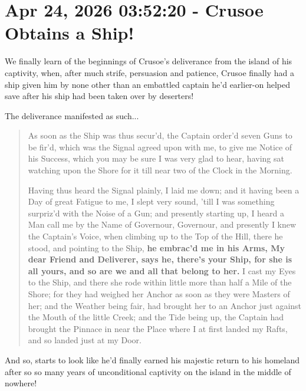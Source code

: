 \documentclass[a4paper]{article}
\begin{document}
\section{Apr 24, 2026 03:52:20 - Crusoe Obtains a Ship!}
\label{SEC64}


We finally learn of the beginnings of Crusoe's deliverance from the island of his captivity, when, after much strife, persuasion and patience, Crusoe finally had a ship given him by none other than an embattled captain he'd earlier-on helped save after his ship had been taken over by deserters!

The deliverance manifested as such...


\noindent
\begin{minipage}{1\textwidth}
\vspace{1em}
\begin{quotation}
{\ttfamily


As soon as the Ship was thus secur’d, the Captain order’d seven Guns to be fir’d, which was the Signal agreed upon with me, to give me Notice of his Success, which you may be sure I was very glad to hear, having sat watching upon the Shore for it till near two of the Clock in the Morning.

Having thus heard the Signal plainly, I laid me down; and it having been a Day of great Fatigue to me, I slept very sound, ’till I was something surpriz’d with the Noise of a Gun; and presently starting up, I heard a Man call me by the Name of Governour, Governour, and presently I knew the Captain’s Voice, when climbing up to the Top of the Hill, there he stood, and pointing to the Ship, \textbf{he embrac’d me in his Arms, My dear Friend and Deliverer, says he, there’s your Ship, for she is all yours, and so are we and all that belong to her.} I cast my Eyes to the Ship, and there she rode within little more than half a Mile of the Shore; for they had weighed her Anchor as soon as they were Masters of her; and the Weather being fair, had brought her to an Anchor just against the Mouth of the little Creek; and the Tide being up, the Captain had brought the Pinnace in near the Place where I at first landed my Rafts, and so landed just at my Door.


}
\end{quotation}
\vspace{1em}
\end{minipage}




And so, starts to look like he'd finally earned his majestic return to his homeland after so so many years of unconditional captivity on the island in the middle of nowhere!
\end{document}
